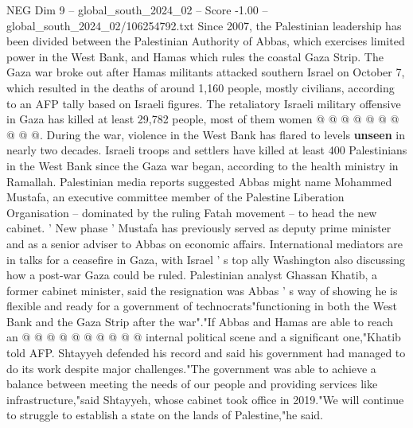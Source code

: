 \begin{textsample}{NEG Dim 9 – global\_south\_2024\_02 – Score -1.00 – global\_south\_2024\_02/106254792.txt}
Since 2007, the Palestinian leadership has been divided between the Palestinian Authority of Abbas, which exercises limited power in the West Bank, and Hamas which rules the coastal Gaza Strip.
The Gaza war broke out after Hamas militants attacked southern Israel on October 7, which resulted in the deaths of around 1,160 people, mostly civilians, according to an AFP tally based on Israeli figures.
The retaliatory Israeli military offensive in Gaza has killed at least 29,782 people, most of them women @ @ @ @ @ @ @ @ @ @.
During the war, violence in the West Bank has flared to levels \textbf{unseen} in nearly two decades.
Israeli troops and settlers have killed at least 400 Palestinians in the West Bank since the Gaza war began, according to the health ministry in Ramallah.
Palestinian media reports suggested Abbas might name Mohammed Mustafa, an executive committee member of the Palestine Liberation Organisation -- dominated by the ruling Fatah movement -- to head the new cabinet. ' New phase ' Mustafa has previously served as deputy prime minister and as a senior adviser to Abbas on economic affairs.
International mediators are in talks for a ceasefire in Gaza, with Israel ' s top ally Washington also discussing how a post-war Gaza could be ruled.
Palestinian analyst Ghassan Khatib, a former cabinet minister, said the resignation was Abbas ' s way of showing he is flexible and ready for a government of technocrats"functioning in both the West Bank and the Gaza Strip after the war"."If Abbas and Hamas are able to reach an @ @ @ @ @ @ @ @ @ @ internal political scene and a significant one,"Khatib told AFP.
Shtayyeh defended his record and said his government had managed to do its work despite major challenges."The government was able to achieve a balance between meeting the needs of our people and providing services like infrastructure,"said Shtayyeh, whose cabinet took office in 2019."We will continue to struggle to establish a state on the lands of Palestine,"he said.

\end{textsample}
